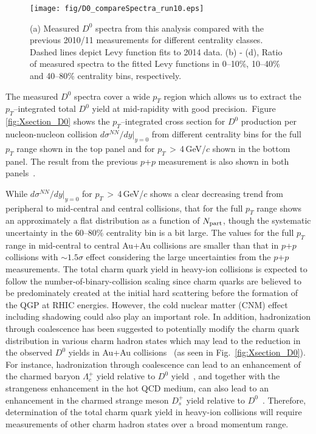 \documentclass[%
 reprint,	
showpacs,
 amsmath,amssymb,
 aps,
 prc,
]{revtex4-1}
\begin{document}
\begin{figure}
\centering
\texttt{[image: fig/D0\_compareSpectra\_run10.eps]}
  \caption{(a) Measured $D^{0}$ spectra from this analysis compared with the previous 2010/11 measurements for different centrality classes. Dashed lines depict Levy function fits to 2014 data. (b) - (d), Ratio of measured spectra to the fitted Levy functions in 0--10\%, 10--40\% and 40--80\% centrality bins, respectively.}
\label{fig:D0_compareSpectra_run10} 
\end{figure}


The measured $D^0$ spectra cover a wide $p_{T}$ region which allows us to extract the $p_{T}$--integrated total $D^0$ yield at mid-rapidity with good precision.\,\,\,Figure\,\,\ref{fig:Xsection_D0} shows the $p_{T}$--integrated cross section for $D^0$ production per nucleon-nucleon collision $d\sigma^{NN}/dy|_{y=0}$ from different centrality bins for the full $p_{T}$ range shown in the top panel and for $p_{T}$\,$>$\,4\,GeV/$c$ shown in the bottom panel. The result from the previous $p$+$p$ measurement is also shown in both panels~\cite{Star_D_pp}.

While $d\sigma^{NN}/dy|_{y=0}$ for $p_{T}$\,$>$\,4\,GeV/$c$ shows a clear decreasing trend from peripheral to mid-central and central collisions, that for the full $p_T$ range shows an approximately a flat distribution as a function of $N_{\rm part}$, though the systematic uncertainty in the 60--80\% centrality bin is a bit large. The values for the full $p_T$ range in mid-central to central Au+Au collisions are smaller than that in $p$+$p$ collisions with $\sim1.5\sigma$ effect considering the large uncertainties from the $p$+$p$ measurements. The total charm quark yield in heavy-ion collisions is expected to follow the number-of-binary-collision scaling since charm quarks are believed to be predominately created at the initial hard scattering before the formation of the QGP at RHIC energies. However, the cold nuclear matter (CNM) effect including shadowing could also play an important role. In addition, hadronization through coalescence has been suggested to potentially modify the charm quark distribution in various charm hadron states which may lead to the reduction in the observed $D^0$ yields in Au+Au collisions~\cite{GRECO2004202} (as seen in Fig.~\ref{fig:Xsection_D0}). For instance, hadronization through coalescence can lead to an enhancement of the charmed baryon $\Lambda_{c}^+$ yield relative to $D^0$ yield~\cite{Oh2009,Zhao:2018jlw,Plumari:2017ntm}, and together with the strangeness enhancement in the hot QCD medium, can also lead to an enhancement in the charmed strange meson $D_{s}^+$ yield relative to $D^0$~\cite{He2013,Zhao:2018jlw,Plumari:2017ntm}. Therefore, determination of the total charm quark yield in heavy-ion collisions will require measurements of other charm hadron states over a broad momentum range. 
\end{document}

